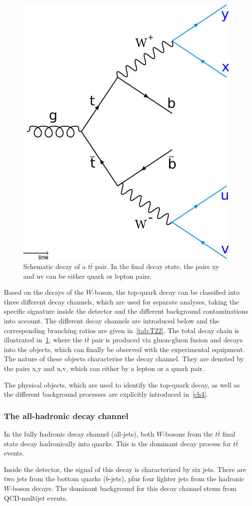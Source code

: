 \begin{figure}[h]
	\centering
	\includegraphics[width=0.3\linewidth]{Pics/cp1/Decay}
	\caption{Schematic decay of a $t\bar{t}$ pair. In the final decay state, the pairs xy and uv can be either quark or lepton pairs.  }
	\label{fig:Decay}
\end{figure}

 Based on the decays of the $W$-boson, the top-quark decay can be classified into three different decay channels, which are used for separate analyses, taking the specific signature inside the detector and the different background contaminations into account. The different decay channels are introduced below and  the corresponding branching ratios are given in~\cref{tab:T22}. The total decay chain is illustrated in~\cref{fig:Decay}, where the  $t\bar{t}$ pair is produced via  gluon-gluon fusion and  decays into the objects, which can finally be observed with the experimental equipment. The nature of these objects characterise the decay channel. They are denoted by the pairs x,y and u,v, which can either by a lepton or a quark pair.

The physical objects, which are used to identify the top-quark decay, as well as the different background processes are explicitly introduced in~\cref{ch4}. 



\subsubsection{The all-hadronic decay channel}
In the fully hadronic decay channel (all-jets), both $W$-bosons from the $t\bar{t}$ final state decay hadronically into quarks. This is the dominant decay process for $t\bar{t}$ events. 

 Inside the detector, the signal of this decay is characterized by six jets. There are two jets  from the bottom quarks ($b$-jets), plus four lighter jets from the hadronic $W$-boson decays. The dominant background  for this decay channel stems from QCD-multijet events.

